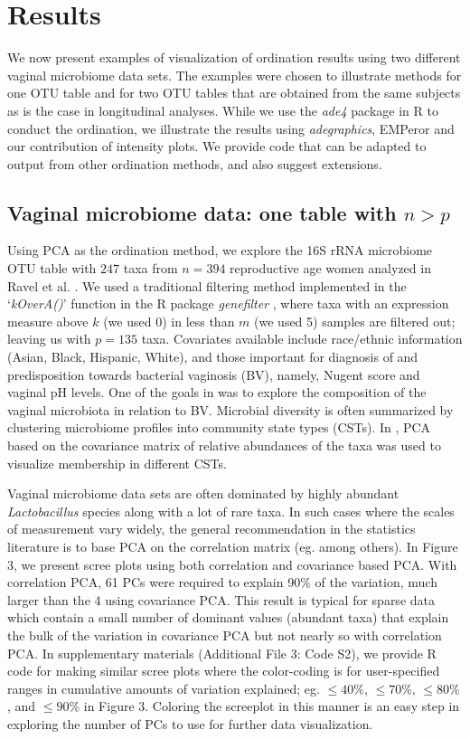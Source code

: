\documentclass[doublespacing]{bmcart}
\begin{document}
\section*{Results}

We now present examples of visualization of ordination results using two different vaginal microbiome data sets. The examples were chosen to illustrate methods for one OTU table and for two OTU tables that are obtained from the same subjects as is the case in longitudinal analyses. While we use the \textit{ade4} package in R to conduct the ordination, we illustrate the results using \textit{adegraphics}, EMPeror and our contribution of intensity plots. We provide code that can be adapted to output from other ordination methods, and also suggest extensions.

\subsection*{Vaginal microbiome data: one table with $n >p$ }

Using PCA as the ordination method, we explore the 16S rRNA microbiome OTU table with $247$ taxa from $n=394$ reproductive age women analyzed in Ravel et al. \cite{Ravel}. We used a traditional filtering method implemented in the `{\it kOverA()}' function in the R package {\it genefilter} \cite{Gentleman}, where taxa with an expression measure above $k$ (we used 0) in less than $m$ (we used 5) samples are filtered out; leaving us with $p=135$ taxa. 
Covariates available include race/ethnic information (Asian, Black, Hispanic, White), and those important for diagnosis of and predisposition towards bacterial vaginosis (BV), namely, Nugent score and vaginal pH levels. One of the goals in \cite{Ravel}  was to explore the composition of the vaginal microbiota in relation to BV.  Microbial diversity is often summarized by clustering microbiome profiles into community state types (CSTs).  In \cite{Ravel}, PCA based on the covariance matrix of relative abundances of the taxa was used to visualize membership in different CSTs.

Vaginal microbiome data sets are often dominated by highly abundant {\it Lactobacillus} species along with a lot of rare taxa. In such cases where the scales of measurement vary widely, the general recommendation in the statistics literature is to base PCA on the correlation matrix (eg. \cite{Izenman} among others). In Figure 3, we present scree plots using both correlation and covariance based PCA. With correlation PCA, 61 PCs were required to explain 90\% of the variation, much larger than the 4 using covariance PCA.  This result is typical for sparse data which contain a small number of dominant values (abundant taxa) that explain the bulk of the variation in covariance PCA but not nearly so with correlation PCA. In supplementary materials (Additional File 3: Code S2), we provide R code for making similar scree plots where the color-coding is for user-specified ranges in cumulative amounts of variation explained; eg. $\leq 40\%$, $ \leq 70\%$, $ \leq 80\%$, and $\leq 90\%$ in Figure 3.  Coloring the screeplot in this manner is an easy step in exploring the number of PCs to use for further data visualization. 
\end{document}
